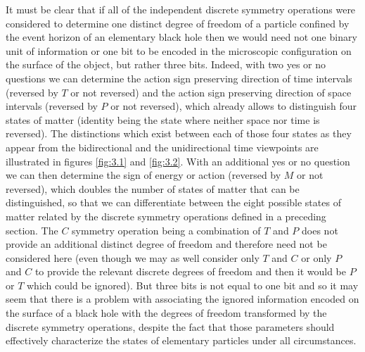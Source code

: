 \documentclass[notitlepage,12pt]{report}
\begin{document}
It must be clear that if all of the independent discrete symmetry operations were considered to determine one distinct degree of freedom of a particle confined by the event horizon of an elementary black hole then we would need not one binary unit of information or one bit to be encoded in the microscopic configuration on the surface of the object, but rather three bits. Indeed, with two yes or no questions we can determine the action sign preserving direction of time intervals (reversed by $T$ or not reversed) and the action sign preserving direction of space intervals (reversed by $P$ or not reversed), which already allows to distinguish four states of matter (identity being the state where neither space nor time is reversed). The distinctions which exist between each of those four states as they appear from the bidirectional and the unidirectional time viewpoints are illustrated in figures \ref{fig:3.1} and \ref{fig:3.2}. With an additional yes or no question we can then determine the sign of energy or action (reversed by $M$ or not reversed), which doubles the number of states of matter that can be distinguished, so that we can differentiate between the eight possible states of matter related by the discrete symmetry operations defined in a preceding section. The $C$ symmetry operation being a combination of $T$ and $P$ does not provide an additional distinct degree of freedom and therefore need not be considered here (even though we may as well consider only $T$ and $C$ or only $P$ and $C$ to provide the relevant discrete degrees of freedom and then it would be $P$ or $T$ which could be ignored). But three bits is not equal to one bit and so it may seem that there is a problem with associating the ignored information encoded on the surface of a black hole with the degrees of freedom transformed by the discrete symmetry operations, despite the fact that those parameters should effectively characterize the states of elementary particles under all circumstances.
\end{document}
